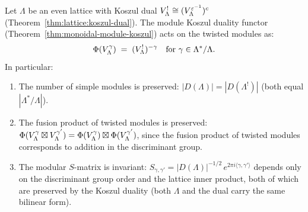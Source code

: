 \begin{proposition}
\label{prop:lattice-module-koszul}
Let $\Lambda$ be an even lattice with Koszul dual
$V_\Lambda^! \cong (V_\Lambda^{\varepsilon^{-1}})^c$
\textup{(}Theorem~\textup{\ref{thm:lattice:koszul-dual})}.  The
module Koszul duality functor
\textup{(}Theorem~\textup{\ref{thm:monoidal-module-koszul})}
acts on the twisted modules as:
\begin{equation}\label{eq:lattice-module-koszul}
\Phi(V_\Lambda^\gamma)
\;=\;
(V_\Lambda^!)^{-\gamma}
\quad\text{for }\gamma \in \Lambda^*/\Lambda.
\end{equation}
In particular:
\begin{enumerate}[label=\textup{(\roman*)}]
\item The number of simple modules is preserved:
  $|D(\Lambda)| = |D(\Lambda^!)|$
  \textup{(}both equal $|\Lambda^*/\Lambda|$\textup{)}.
\item The fusion product of twisted modules is preserved:
  $\Phi(V_\Lambda^\gamma \boxtimes V_\Lambda^{\gamma'})
  = \Phi(V_\Lambda^\gamma) \boxtimes \Phi(V_\Lambda^{\gamma'})$,
  since the fusion product of twisted modules corresponds to addition
  in the discriminant group.
\item The modular $S$-matrix is invariant:
  $S_{\gamma,\gamma'} = |D(\Lambda)|^{-1/2}\,e^{2\pi i \langle\gamma,\gamma'\rangle}$
  depends only on the discriminant group order and the lattice inner product,
  both of which are preserved by the Koszul duality
  \textup{(}both $\Lambda$ and the dual carry the same bilinear
  form\textup{)}.
\end{enumerate}
\end{proposition}

